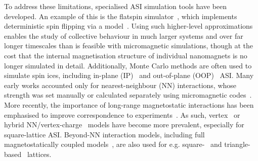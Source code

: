 To address these limitations, specialised ASI simulation tools have been developed.
An example of this is the flatspin simulator~\cite{flatspin}, which implements deterministic spin flipping via a  model~\cite{StonerWohlfarth2008}.
Using such higher-level approximations enables the study of collective behaviour in much larger systems and over far longer timescales than is feasible with micromagnetic simulations, though at the cost that the internal magnetisation structure of individual nanomagnets is no longer simulated in detail.
Additionally, Monte Carlo methods are often used to simulate spin ices, including in-plane (IP)~\cite{Qi2008,Cugliandolo2017,LocalizedFrustratedKagome,Brunn2021,Farhan2013,ApparentFMpinwheel} and out-of-plane (OOP)~\cite{Chioar2014,PerpendicularMagnetizationASI} ASI. %
Many early works accounted only for nearest-neighbour (NN) interactions, whose strength was set manually or calculated separately using micromagnetic codes~\cite{Qi2008,PerpendicularMagnetizationASI}. %
More recently, the importance of long-range magnetostatic interactions has been emphasised to improve correspondence to experiments~\cite{Chioar2014,Rougemaille2011,Brunn2021}.
As such, vertex~\cite{gilbert2014emergent,Saglam2022Tetris,Goryca2021Plasma,MeltingASI} or hybrid NN/vertex-charge~\cite{Canals2016,zhang2013crystallites} models have become more prevalent, especially for square-lattice ASI. %
Beyond-NN interaction models, including full magnetostatically coupled models~\cite{ApparentFMpinwheel,mengotti2011kagome}, are also used for e.g. square-~\cite{Brunn2021,Farhan2013,sklenar2019field} and triangle-based~\cite{Chioar2014,Rougemaille2011,Hofhuis2020} lattices. \par %
